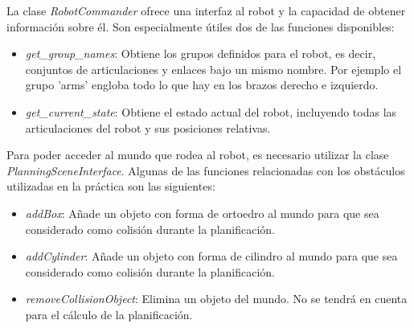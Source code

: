\documentclass[12pt,spanish,chapterprefix, numbers=noenddot]{book}
\numberwithin{equation}{section}
\numberwithin{figure}{section}
\begin{document}
La clase \textit{RobotCommander} ofrece una interfaz al robot y la capacidad de obtener información sobre él. Son especialmente útiles dos de las funciones disponibles: 
\begin{itemize}
\item \textit{get\_group\_names}: Obtiene los grupos definidos para el robot, es decir, conjuntos de articulaciones y enlaces bajo un mismo nombre.  Por ejemplo el grupo 'arms' engloba todo lo que hay en los brazos derecho e izquierdo. 
\item \textit{get\_current\_state}: Obtiene el estado actual del robot, incluyendo todas las articulaciones del robot y sus posiciones relativas. 
\end{itemize}
\newpage
Para poder acceder al mundo que rodea al robot, es necesario utilizar la clase \textit{PlanningSceneInterface}. Algunas de las funciones relacionadas con los obstáculos utilizadas en la práctica son las siguientes: 
\begin{itemize}
\item \textit{addBox}: Añade un objeto con forma de ortoedro al mundo para que sea considerado como colisión durante la planificación. 
\item \textit{addCylinder}: Añade un objeto con forma de cilindro al mundo para que sea considerado como colisión durante la planificación. 
\item \textit{removeCollisionObject}: Elimina un objeto del mundo. No se tendrá en cuenta para el cálculo de la planificación.  
\end{itemize}
\end{document}
